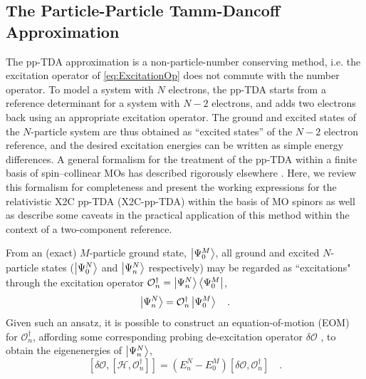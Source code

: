 \subsection{The Particle-Particle Tamm-Dancoff Approximation}
\label{subsec:ppTDA}
The pp-TDA approximation is a non-particle-number conserving method, i.e. the excitation operator of \cref{eq:ExcitationOp} does not commute with the number operator. 
To model a system with $N$ electrons, the pp-TDA starts from a reference determinant for a system with $N-2$  electrons, and adds two electrons back using 
an appropriate excitation operator.
The ground and excited states of the $N$-particle system are thus obtained as ``excited states'' of the $N-2$ electron reference, and the desired excitation energies can be written as simple energy differences.
A general formalism for the treatment of the pp-TDA within a finite basis of spin--collinear MOs has described rigorously elsewhere \cite{Yang13_224105,Yang13_18A522,Yang13_104112}.
Here, we review this formalism for completeness and present the working expressions for the relativistic X2C pp-TDA (X2C-pp-TDA) within the basis of MO spinors 
as well as describe some caveats in the practical application of this method within the context of a two-component reference.

From an (exact) $M$-particle ground state, $\left\vert \Psi_0^M \right\rangle$, all ground and excited 
$N$-particle states ($\left\vert \Psi_0^N \right\rangle$ and $\left\vert \Psi_n^N \right\rangle$ respectively) may be regarded as ``excitations" through the 
excitation operator $\mathcal{O}^\dagger_n = \left\vert \Psi_n^N \right\rangle\left\langle \Psi_0^M \right\vert$,
\begin{equation}
 \left\vert \Psi_n^N \right\rangle = \mathcal{O}^\dagger_n \left\vert \Psi_0^M \right\rangle \quad.
\end{equation}
Given such an ansatz, it is possible to construct an equation-of-motion (EOM)\cite{SchuckBook_04} for $\mathcal{O}_n^\dagger$, affording some corresponding
probing de-excitation operator $\delta \mathcal{O}$ , to obtain the eigenenergies of $\left\vert \Psi_n^N \right\rangle$,
\begin{equation}
\label{eq:EOM}
 \left[ \delta \mathcal{O},\left[ \mathcal{H}, \mathcal{O}_n^\dagger \right]\right] = (E^N_n - E^M_0)\left[\delta \mathcal{O}, \mathcal{O}^\dagger_n \right]
 \quad.
\end{equation}

